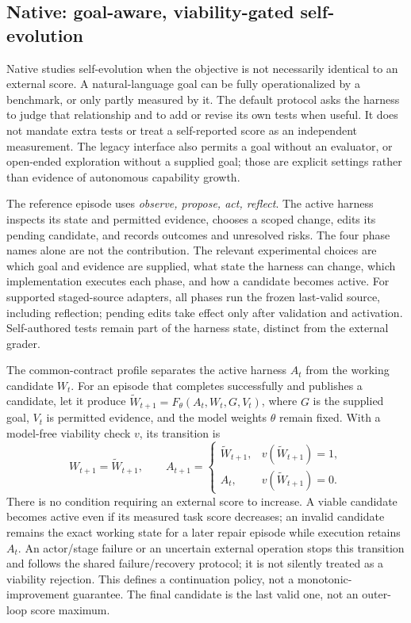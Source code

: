 \subsection{Native: goal-aware, viability-gated self-evolution}
\label{sec:native}

Native studies self-evolution when the objective is not necessarily identical to an external score. A natural-language goal can be fully operationalized by a benchmark, or only partly measured by it. The default protocol asks the harness to judge that relationship and to add or revise its own tests when useful. It does not mandate extra tests or treat a self-reported score as an independent measurement. The legacy interface also permits a goal without an evaluator, or open-ended exploration without a supplied goal; those are explicit settings rather than evidence of autonomous capability growth.

The reference episode uses \emph{observe, propose, act, reflect}. The active harness inspects its state and permitted evidence, chooses a scoped change, edits its pending candidate, and records outcomes and unresolved risks. The four phase names alone are not the contribution. The relevant experimental choices are which goal and evidence are supplied, what state the harness can change, which implementation executes each phase, and how a candidate becomes active. For supported staged-source adapters, all phases run the frozen last-valid source, including reflection; pending edits take effect only after validation and activation. Self-authored tests remain part of the harness state, distinct from the external grader.

The common-contract profile separates the active harness $A_t$ from the working candidate $W_t$. For an episode that completes successfully and publishes a candidate, let it produce $\widetilde W_{t+1}=F_\theta(A_t,W_t,G,V_t)$, where $G$ is the supplied goal, $V_t$ is permitted evidence, and the model weights $\theta$ remain fixed. With a model-free viability check $v$, its transition is
\begin{equation}
 W_{t+1}=\widetilde W_{t+1},\qquad
 A_{t+1}=\begin{cases}
 \widetilde W_{t+1}, & v(\widetilde W_{t+1})=1,\\
 A_t, & v(\widetilde W_{t+1})=0.
 \end{cases}
\label{eq:native-transition}
\end{equation}
There is no condition requiring an external score to increase. A viable candidate becomes active even if its measured task score decreases; an invalid candidate remains the exact working state for a later repair episode while execution retains $A_t$. An actor/stage failure or an uncertain external operation stops this transition and follows the shared failure/recovery protocol; it is not silently treated as a viability rejection. This defines a continuation policy, not a monotonic-improvement guarantee. The final candidate is the last valid one, not an outer-loop score maximum.

